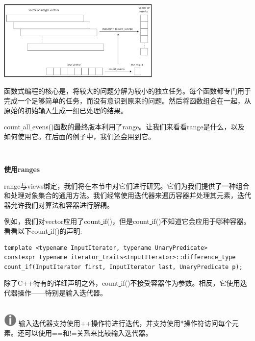 \begin{center}
	\includegraphics[width=0.6\textwidth]{content/Section-2/Chapter-7/3}
\end{center}

函数式编程的核心是，将较大的问题分解为较小的独立任务。每个函数都专门用于完成一个足够简单的任务，而没有意识到原来的问题。然后将函数组合在一起，从原始的初始输入生成一组已处理的结果。 \par
count\underline{ }all\underline{ }evens()函数的最终版本利用了range。让我们来看看range是什么，以及如何使用它。在后面的例子中，我们还会用到它。 \par

\noindent\textbf{}\ \par
\textbf{使用ranges} \ \par
range与views绑定，我们将在本节中对它们进行研究。它们为我们提供了一种组合和处理对象集合的通用方法。我们经常使用迭代器来遍历容器并处理其元素，迭代器允许我们对算法和容器进行解耦。 \par
例如，我们对vector应用了count\underline{ }if()，但是count\underline{ }if()不知道它会应用于哪种容器。看看以下count\underline{ }if()的声明: \par

\begin{lstlisting}[caption={}]
template <typename InputIterator, typename UnaryPredicate>
constexpr typename iterator_traits<InputIterator>::difference_type
count_if(InputIterator first, InputIterator last, UnaryPredicate p);
\end{lstlisting}

除了C++特有的详细声明之外，count\underline{ }if()不接受容器作为参数。相反，它使用迭代器操作——特别是输入迭代器。 \par

\hspace*{\fill} \\ %
\includegraphics[width=0.05\textwidth]{images/warn}
输入迭代器支持使用++操作符进行迭代，并支持使用*操作符访问每个元素。还可以使用==和!=关系来比较输入迭代器。 \par
\noindent\textbf{}\ \par

